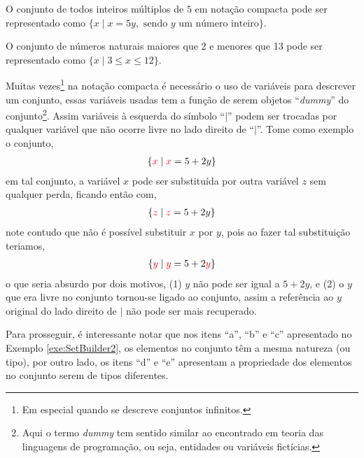 \begin{exemplo}\label{exe:SetBuilder3}
  O conjunto de todos inteiros múltiplos de $5$ em notação compacta pode ser representado como $\{x \mid x = 5y, \text{ sendo $y$ um número inteiro}\}$.
\end{exemplo}

\begin{exemplo}\label{exe:SetBuilder4}
  O conjunto de números naturais maiores que 2 e menores que 13 pode ser representado como  $\{x \mid 3 \leq x \leq 12\}$.
\end{exemplo}

\begin{atencao}\label{note:DummyEmConjunto}
  Muitas vezes\footnote{Em especial quando se descreve conjuntos infinitos.} na notação compacta é necessário o uso de variáveis para descrever um conjunto, essas variáveis usadas tem a função de serem objetos ``\textit{dummy}'' do conjunto\footnote{Aqui o termo \textit{dummy} tem sentido similar ao encontrado em teoria das linguagens de programação, ou seja, entidades ou variáveis fictícias.}. Assim variáveis à esquerda do símbolo ``$\mid$'' podem ser trocadas por qualquer variável que não ocorre livre no lado direito de ``$\mid$''. Tome como exemplo o conjunto, 
  \begin{eqnarray*}
    \{{\color{red}x} \mid {\color{red}x} = 5 + 2y\}
  \end{eqnarray*}
  em tal conjunto, a variável $x$ pode ser substituída por outra variável $z$ sem qualquer perda, ficando então com,
  \begin{eqnarray*}
    \{{\color{red}z} \mid {\color{red}z} = 5 + 2y\}
  \end{eqnarray*}
  note contudo que não é possível substituir $x$ por $y$, pois ao fazer tal substituição teriamos,
  \begin{eqnarray*}
    \{{\color{red}y} \mid {\color{red}y} = 5 + 2{\color{red}y}\}
  \end{eqnarray*}
  o que seria absurdo por dois motivos, (1) $y$ não pode ser igual a $5 + 2y$, e (2) o $y$ que era livre no conjunto tornou-se ligado ao conjunto, assim a referência ao $y$ original do lado direito de $\mid$ não pode ser mais recuperado.
\end{atencao}

\normalfont Para prosseguir, é interessante notar que nos itens ``a'', ``b'' e ``c'' apresentado no Exemplo \ref{exe:SetBuilder2}, os elementos no conjunto têm a mesma natureza (ou tipo), por outro lado, os itens ``d'' e ``e'' apresentam a propriedade dos elementos no conjunto serem de tipos diferentes. 

